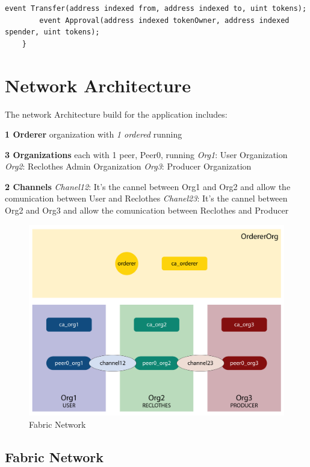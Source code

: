 {\begin{lstlisting}[language=Solidity]
        event Transfer(address indexed from, address indexed to, uint tokens);
        event Approval(address indexed tokenOwner, address indexed spender, uint tokens);
    }
\end{lstlisting}

\section{Network Architecture}

The network Architecture build for the application includes:

\begin{outline}[enumerate]
    \1 \textbf{1 Orderer} organization with \textit{1 ordered} running

    \1 \textbf{3 Organizations} each with 1 peer, Peer0, running
    \2 \textit{Org1}: User Organization
    \2 \textit{Org2}: Reclothes Admin Organization 
    \2 \textit{Org3}: Producer Organization

    \1 \textbf{2 Channels}
    \2 \textit{Chanel12}: It's the cannel between Org1 and Org2 and allow the comunication between User and Reclothes
    \2 \textit{Chanel23}: It's the cannel between Org2 and Org3 and allow the comunication between Reclothes and Producer
\end{outline}

\begin{figure}[h!]
	\centering
	\includegraphics[totalheight=8cm]{img/fabric_network.png}
	\caption{Fabric Network}
	\label{fig:fabric_network}
\end{figure}

\subsection{Fabric Network}

}
